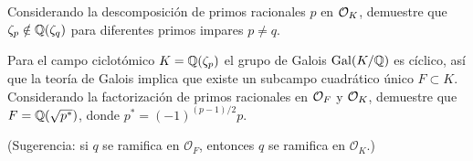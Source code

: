 \begin{ejercicio}
  Considerando la descomposición de primos racionales $p$ en $\mathcal{O}_K$, demuestre que
  $\zeta_p \notin \mathbb{Q} (\zeta_q)$ para diferentes primos impares $p \ne q$.
\end{ejercicio}

\begin{ejercicio}
  Para el campo ciclotómico $K = \mathbb{Q} (\zeta_p)$ el grupo de Galois
  $\operatorname{Gal} (K/\mathbb{Q})$ es cíclico, así que la teoría de Galois implica que
  existe un subcampo cuadrático único $F \subset K$.
  Considerando la factorización de primos racionales en $\mathcal{O}_F$ y $\mathcal{O}_K$,
  demuestre que $F = \mathbb{Q} (\sqrt{p^*})$, donde $p^* = (-1)^{(p-1)/2} p$.

  \noindent (Sugerencia: si $q$ se ramifica en $\mathcal{O}_F$, entonces $q$ se
  ramifica en $\mathcal{O}_K$.)
\end{ejercicio}
